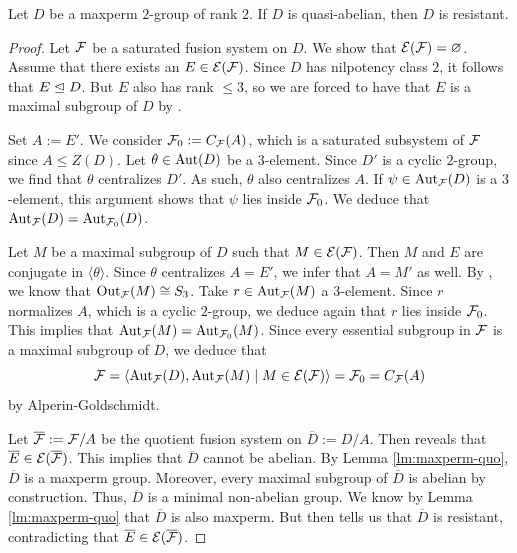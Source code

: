 \documentclass[bysection, amsart]{standard}
\begin{document}
\begin{proposition} \label{prp:metabelian-res}
    Let $D$ be a maxperm $2$-group of rank $2$. If $D$ is quasi-abelian, then $D$ is resistant.
\end{proposition}
\begin{proof}
    Let $\mathcal{F}$ be a saturated fusion system on $D$. We show that $\mathcal{E}(\mathcal{F}) = \varnothing$. Assume that there exists an $E \in \mathcal{E}(\mathcal{F})$. Since $D$ has nilpotency class $2$, it follows that $E \trianglelefteq D$. But $E$ also has rank $\leq 3$, so we are forced to have that $E$ is a maximal subgroup of $D$ by \cite[Lemma 3.3]{paper:oliver-srank4}.
    
    Set $A := E'$. We consider $\mathcal{F}_0 := C_{\mathcal{F}}(A)$, which is a saturated subsystem of $\mathcal{F}$ since $A \leq Z(D)$. Let $\theta \in \operatorname{Aut}(D)$ be a $3$-element. Since $D'$ is a cyclic $2$-group, we find that $\theta$ centralizes $D'$. As such, $\theta$ also centralizes $A$. If $\psi \in \operatorname{Aut}_{\mathcal{F}}(D)$ is a $3$-element, this argument shows that $\psi$ lies inside $\mathcal{F}_0$. We deduce that $\operatorname{Aut}_{\mathcal{F}}(D) = \operatorname{Aut}_{\mathcal{F}_0}(D)$.
    
    Let $M$ be a maximal subgroup of $D$ such that $M \in \mathcal{E}(\mathcal{F})$. Then $M$ and $E$ are conjugate in $\langle \theta \rangle$. Since $\theta$ centralizes $A = E'$, we infer that $A = M'$ as well. By \cite[Lemma 3.3]{paper:oliver-srank4}, we know that $\operatorname{Out}_{\mathcal{F}}(M) \cong S_3$. Take $r \in \operatorname{Aut}_{\mathcal{F}}(M)$ a $3$-element. Since $r$ normalizes $A$, which is a cyclic $2$-group, we deduce again that $r$ lies inside $\mathcal{F}_0$. This implies that $\operatorname{Aut}_{\mathcal{F}}(M) = \operatorname{Aut}_{\mathcal{F}_0}(M)$. Since every essential subgroup in $\mathcal{F}$ is a maximal subgroup of $D$, we deduce that
    \[\mathcal{F} = \langle \operatorname{Aut}_{\mathcal{F}}(D), \operatorname{Aut}_{\mathcal{F}}(M) \mid M \in \mathcal{E}(\mathcal{F}) \rangle = \mathcal{F}_0 = C_{\mathcal{F}}(A)\]
    by Alperin-Goldschmidt. 

    Let $\overline{\mathcal{F}} := \mathcal{F}/A$ be the quotient fusion system on $\overline{D} := D/A$. Then \cite[Theorem 5.6]{book:cra} reveals that $\overline{E} \in \mathcal{E}(\overline{\mathcal{F}})$. This implies that $\overline{D}$ cannot be abelian. By Lemma \ref{lm:maxperm-quo}, $\overline{D}$ is a maxperm group. Moreover, every maximal subgroup of $\overline{D}$ is abelian by construction. Thus, $\overline{D}$ is a minimal non-abelian group. We know by Lemma \ref{lm:maxperm-quo} that $\overline{D}$ is also maxperm. But then \cite[Theorem 2.4]{paper:sambale} tells us that $\overline{D}$ is resistant, contradicting that $\overline{E} \in \mathcal{E}(\overline{\mathcal{F}})$.
\end{proof}
\end{document}
